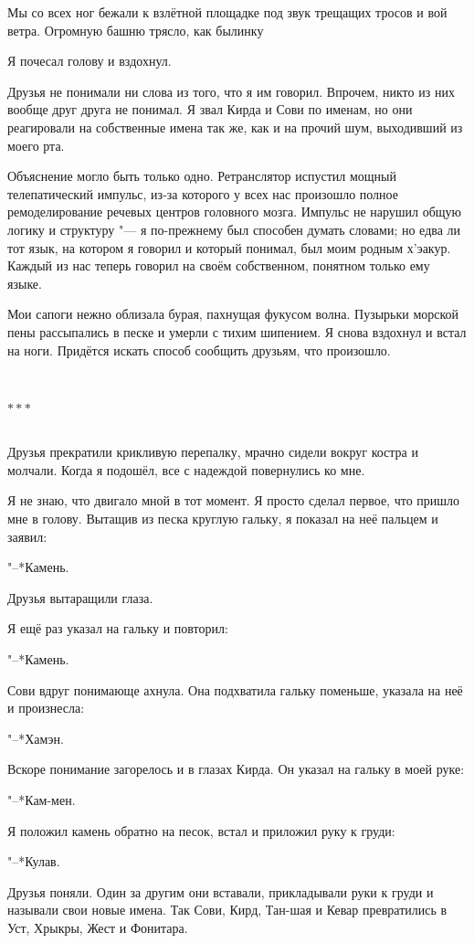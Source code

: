 \documentclass[a4paper,12pt,fleqn]{book}
\newcommand{\ldotst}{\so{...}\xspace}
\newcommand{\razd}{~\\{\centering\Large\bfseries$\ast \ast \ast$\par}~\\}
\begin{document}
Мы со всех ног бежали к взлётной площадке под звук трещащих тросов и вой ветра.
Огромную башню трясло, как былинку\ldotst

Я почесал голову и вздохнул.

Друзья не понимали ни слова из того, что я им говорил.
Впрочем, никто из них вообще друг друга не понимал.
Я звал Кирда и Сови по именам, но они реагировали на собственные имена так же, как и на прочий шум, выходивший из моего рта.

Объяснение могло быть только одно.
Ретранслятор испустил мощный телепатический импульс, из-за которого у всех нас произошло полное ремоделирование речевых центров головного мозга.
Импульс не нарушил общую логику и структуру "--- я по-прежнему был способен думать словами;
но едва ли тот язык, на котором я говорил и который понимал, был моим родным х'эакур.
Каждый из нас теперь говорил на своём собственном, понятном только ему языке.

Мои сапоги нежно облизала бурая, пахнущая фукусом волна.
Пузырьки морской пены рассыпались в песке и умерли с тихим шипением.
Я снова вздохнул и встал на ноги.
Придётся искать способ сообщить друзьям, что произошло.

\razd

Друзья прекратили крикливую перепалку, мрачно сидели вокруг костра и молчали.
Когда я подошёл, все с надеждой повернулись ко мне.

Я не знаю, что двигало мной в тот момент.
Я просто сделал первое, что пришло мне в голову.
Вытащив из песка круглую гальку, я показал на неё пальцем и заявил:

"--*Камень.

Друзья вытаращили глаза.

Я ещё раз указал на гальку и повторил:

"--*Камень.

Сови вдруг понимающе ахнула.
Она подхватила гальку поменьше, указала на неё и произнесла:

"--*Хамэн.

Вскоре понимание загорелось и в глазах Кирда.
Он указал на гальку в моей руке:

"--*Кам-мен.

Я положил камень обратно на песок, встал и приложил руку к груди:

"--*Кулав.

Друзья поняли.
Один за другим они вставали, прикладывали руки к груди и называли свои новые имена.
Так Сови, Кирд, Тан-шая и Кевар превратились в Уст, Хрыкры, Жест и Фонитара.
\end{document}
